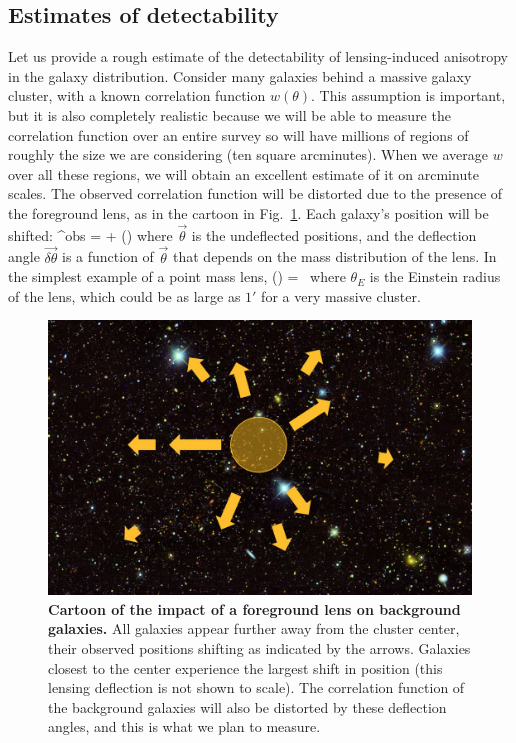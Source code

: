 \subsection{Estimates of detectability}

Let us provide a rough estimate of the detectability of
lensing-induced anisotropy in the galaxy distribution. Consider many
galaxies behind a massive galaxy cluster, with a known correlation
function $w(\theta)$. This assumption is important, but it is also
completely realistic because we will be able to measure the
correlation function over an entire survey so will have millions of
regions of roughly the size we are considering (ten square
arcminutes). When we average $w$ over all these regions, we will
obtain an excellent estimate of it on arcminute scales. The observed
correlation function will be distorted due to the presence of the
foreground lens, as in the cartoon in Fig.~\ref{cluster}. Each
galaxy's position will be shifted: \be \vec\theta^{\rm obs} =
\vec\theta + \vec{\delta\theta}(\vec\theta) \ee where $\vec\theta$ is
the undeflected positions, and the deflection angle $\vec
{\delta\theta}$ is a function of $\vec\theta$ that depends on the mass
distribution of the lens. In the simplest example of a point mass
lens, \be \vec{\delta\theta}(\vec\theta) =
\vec\theta\, \ee where $\theta_E$ is the
Einstein radius of the lens, which could be as large as $1'$ for a
very massive cluster.





\begin{figure}
  \begin{center}
    \includegraphics[scale=0.33]{figs/clusterfig.jpg}
  \end{center}
  \caption{
{\bf Cartoon of the impact of a foreground lens on
  background galaxies.} All galaxies appear further away from the
  cluster center, their observed positions shifting as
  indicated by the arrows. Galaxies closest to the center experience
  the largest shift in position (this 
lensing deflection is not shown to scale). The correlation function
of the background galaxies will also be distorted by these deflection
angles, and this is what we plan to measure.}
  \label{cluster}
\end{figure}

